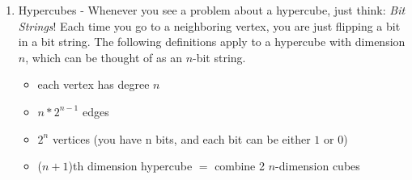 \documentclass[a4paper]{article}
\begin{document}
\begin{enumerate}
\begin{itemize}
		\end{itemize}
	\item Hypercubes - Whenever you see a problem about a hypercube, just think: \textit{Bit Strings}! Each time you go to a neighboring vertex, you are just flipping a bit in a bit string. The following definitions apply to a hypercube with dimension $n$, which can be thought of as an $n$-bit string.
		\begin{itemize}
			\item each vertex has degree $n$
			\item $n*2^{n-1}$ edges 
			\item $2^n$ vertices (you have n bits, and each bit can be either $1$ or $0$)
			\item ($n+1$)th dimension hypercube $=$ combine 2 $n$-dimension cubes
		\end{itemize}

\end{enumerate}
\end{document}
